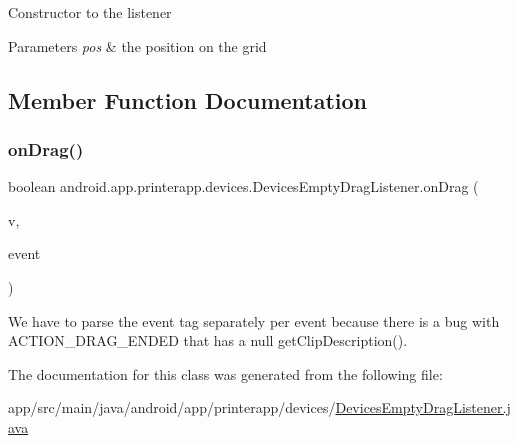 Constructor to the listener 
\begin{DoxyParams}{Parameters}
{\em pos} & the position on the grid \\
\hline
\end{DoxyParams}


\subsection{Member Function Documentation}
\mbox{\label{classandroid_1_1app_1_1printerapp_1_1devices_1_1_devices_empty_drag_listener_ab25787587fe03762eae9e6ef3a689427}} 
\subsubsection{\texorpdfstring{on\+Drag()}{onDrag()}}
{\footnotesize\ttfamily boolean android.\+app.\+printerapp.\+devices.\+Devices\+Empty\+Drag\+Listener.\+on\+Drag (\begin{DoxyParamCaption}\item[{View}]{v,  }\item[{Drag\+Event}]{event }\end{DoxyParamCaption})}

We have to parse the event tag separately per event because there is a bug with A\+C\+T\+I\+O\+N\+\_\+\+D\+R\+A\+G\+\_\+\+E\+N\+D\+ED that has a null get\+Clip\+Description(). 

The documentation for this class was generated from the following file\+:\begin{DoxyCompactItemize}
\item 
app/src/main/java/android/app/printerapp/devices/\hyperlink{_devices_empty_drag_listener_8java}{Devices\+Empty\+Drag\+Listener.\+java}\end{DoxyCompactItemize}
